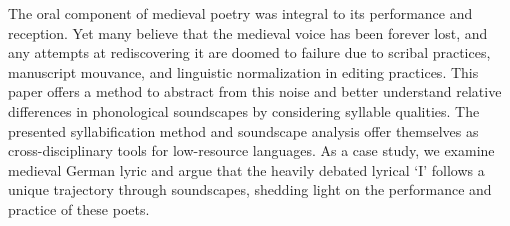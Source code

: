 The oral component of medieval poetry was integral to its performance and reception. Yet many believe that the medieval voice has been forever lost, and any attempts at rediscovering it are doomed to failure due to scribal practices, manuscript mouvance, and linguistic normalization in editing practices. This paper offers a method to abstract from this noise and better understand relative differences in phonological soundscapes by considering syllable qualities. The presented syllabification method and soundscape analysis offer themselves as cross-disciplinary tools for low-resource languages. As a case study, we examine medieval German lyric and argue that the heavily debated lyrical ‘I' follows a unique trajectory through soundscapes, shedding light on the performance and practice of these poets.
